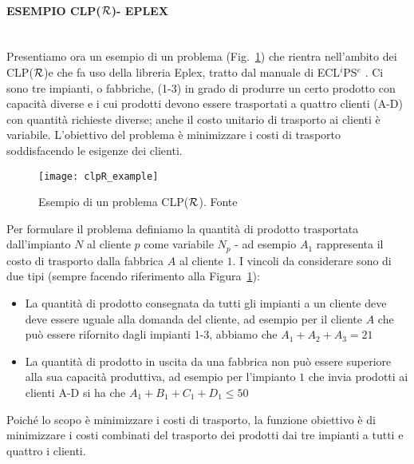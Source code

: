 \documentclass[12pt,a4paper,openright,twoside]{report}
\newcommand{\myparagraph}[1]{\paragraph{#1}\mbox{}\\}
\newcommand{\clpr}{CLP({\ensuremath{\cal R}})}
\begin{document}
\myparagraph{ESEMPIO \clpr - EPLEX}

Presentiamo ora un esempio di un problema (Fig.~\ref{clpR_example}) che rientra nell'ambito dei \clpr e che fa uso della libreria Eplex, tratto dal manuale di ECL$^i$PS$^e$ \cite{eclipseTut}. Ci sono tre impianti, o fabbriche, (1-3) in grado di produrre un certo prodotto con capacità diverse e i cui prodotti devono essere trasportati a quattro clienti (A-D) con quantità richieste diverse; anche il costo unitario di trasporto ai clienti è variabile. L'obiettivo del problema è minimizzare i costi di trasporto soddisfacendo le esigenze dei clienti. 

\begin{figure}[h]
	\centering
	\texttt{[image: clpR\_example]}
	\caption{Esempio di un problema \clpr. Fonte \cite{eclipseTut}}
	\label{clpR_example}
\end{figure}

Per formulare il problema definiamo la quantità di prodotto trasportata dall'impianto $N$ al cliente $p$ come variabile $N_p$ - ad esempio $A_1$ rappresenta il costo di trasporto dalla fabbrica $A$ al cliente $1$. I vincoli da considerare sono di due tipi (sempre facendo riferimento alla Figura~\ref{clpR_example}):
\begin{itemize}
\item La quantità di prodotto consegnata da tutti gli impianti a un cliente deve deve essere uguale alla domanda del cliente, ad esempio per il cliente $A$ che può essere rifornito dagli impianti 1-3, abbiamo che $A_1+A_2+A_3=21$
\item La quantità di prodotto in uscita da una fabbrica non può essere superiore alla sua capacità produttiva, ad esempio per l'impianto $1$ che invia prodotti ai clienti A-D si ha che $A_1+B_1+C_1+D_1 \leq 50$
\end{itemize}   
Poiché lo scopo è minimizzare i costi di trasporto, la funzione obiettivo è di minimizzare i costi combinati del trasporto dei prodotti dai tre impianti a tutti e quattro i clienti.
\end{document}
